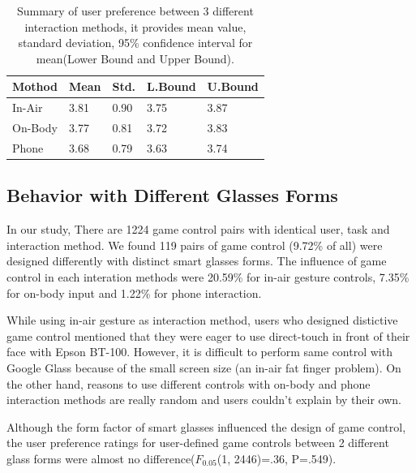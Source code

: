 \documentclass{sigchi}
\newcommand\tabhead[1]{\small\textbf{#1}}
\begin{document}
  \begin{table}
    \centering
    \begin{tabular}{|l|l|l|l|l|}
      \hline
      \tabhead{Mothod} &
      \multicolumn{1}{|p{0.13\columnwidth}|}{\centering\tabhead{Mean}} &
      \multicolumn{1}{|p{0.13\columnwidth}|}{\centering\tabhead{Std.}} &
      \multicolumn{1}{|p{0.13\columnwidth}|}{\centering\tabhead{L.Bound}} &
      \multicolumn{1}{|p{0.13\columnwidth}|}{\centering\tabhead{U.Bound}} \\
      \hline
      In-Air & 3.81 & 0.90 & 3.75 & 3.87\\
      \hline
      On-Body & 3.77 & 0.81 & 3.72 & 3.83\\
      \hline
      Phone & 3.68 & 0.79 & 3.63 & 3.74\\
      \hline

    \end{tabular}
    \caption{Summary of user preference between 3 different interaction methods, it provides mean value, standard deviation, 95\% confidence interval for mean(Lower Bound and Upper Bound).}
    \label{tab:tablePreferenceInteractionMethod}
  \end{table}

  \subsection{Behavior with Different Glasses Forms}
  In our study, There are 1224 game control pairs with identical user, task and interaction method. We found 119 pairs of game control (9.72\% of all) were designed differently with distinct smart glasses forms. The influence of game control in each interation methods were 20.59\% for in-air gesture controls, 7.35\% for on-body input and 1.22\% for phone interaction. 

  While using in-air gesture as interaction method, users who designed distictive game control mentioned that they were eager to use direct-touch in front of their face with Epson BT-100. However, it is difficult to perform same control with Google Glass because of the small screen size (an in-air fat finger problem). On the other hand, reasons to use different controls with on-body and phone interaction methods are really random and users couldn't explain by their own.

  Although the form factor of smart glasses influenced the design of game control, the user preference ratings for user-defined game controls between 2 different glass forms were almost no difference($F_{0.05}$(1, 2446)=.36, P=.549).
\end{document}
